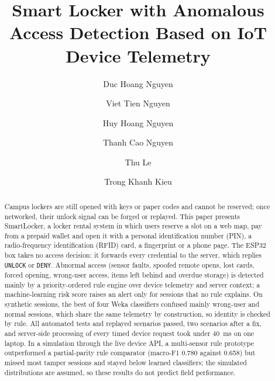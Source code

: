 \documentclass[sigconf,screen]{acmart}
\begin{document}
\title{Smart Locker with Anomalous Access Detection Based on IoT Device Telemetry}

\author{Duc Hoang Nguyen}

\author{Viet Tien Nguyen}

\author{Huy Hoang Nguyen}

\author{Thanh Cao Nguyen}

\author{Thu Le}

\author{Trong Khanh Kieu}

\renewcommand{\shortauthors}{D. H. Nguyen et al.}

\begin{abstract}
Campus lockers are still opened with keys or paper codes and cannot be reserved; once networked, their unlock signal
can be forged or replayed. This paper presents SmartLocker, a locker rental system in which users reserve a slot on a web map,
pay from a prepaid wallet and open it with a personal identification number (PIN), a radio-frequency identification
(RFID) card, a fingerprint or a phone page. The ESP32 box takes no access decision: it forwards every credential to the
server, which replies \texttt{UNLOCK} or \texttt{DENY}. Abnormal access (sensor faults, spoofed remote opens, lost
cards, forced opening, wrong-user access, items left behind and overdue storage) is detected mainly by a
priority-ordered rule engine over device telemetry and server context; a machine-learning risk score raises an alert
only for sessions that no rule explains. On synthetic sessions, the best of four Weka classifiers confused mainly wrong-user and
normal sessions, which share the same telemetry by construction, so identity is checked by rule. All automated tests
and replayed scenarios passed, two scenarios after a fix, and server-side processing of every timed device request took
under 40~ms on one laptop. In a simulation through the live device API, a multi-sensor rule prototype outperformed a
partial-parity rule comparator (macro-F1 0.780 against 0.658) but missed most tamper sessions and stayed below learned
classifiers; the simulated distributions are assumed, so these results do not predict field performance.
\end{abstract}
\end{document}
